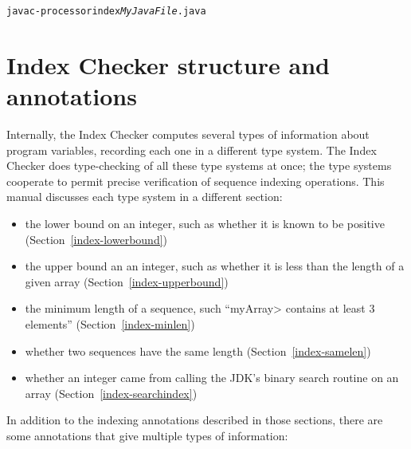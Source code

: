\begin{alltt}
  javac -processor index \emph{MyJavaFile}.java
\end{alltt}


\section{Index Checker structure and annotations\label{index-annotations}}

Internally, the Index Checker computes several types of information about
program variables, recording each one in a different type system.  The
Index Checker does type-checking of all these type systems at once; the
type systems cooperate to permit precise verification of sequence indexing
operations.  This manual discusses each type system in a different
section:
\begin{itemize}
\item
  the lower bound on an integer, such as whether it is known to be positive
  (Section~\ref{index-lowerbound})
\item
  the upper bound an an integer, such as whether it is less than the length
  of a given array (Section~\ref{index-upperbound})
\item
  the minimum length of a sequence, such ``\<myArray> contains at least 3
  elements'' (Section~\ref{index-minlen})
\item
  whether two sequences have the same length (Section~\ref{index-samelen})
\item
  whether an integer came from calling the JDK's binary search routine on
  an array (Section~\ref{index-searchindex})
\end{itemize}

In addition to the indexing annotations described in those sections, there
are some annotations that give multiple types of information:

